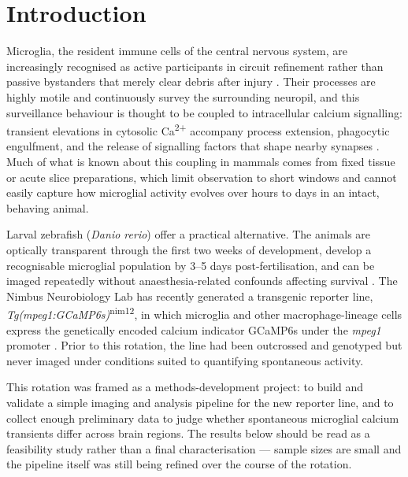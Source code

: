 \section{Introduction}

Microglia, the resident immune cells of the central nervous system, are increasingly
recognised as active participants in circuit refinement rather than passive bystanders
that merely clear debris after injury \citep{nimodorf2019microglia}. Their processes
are highly motile and continuously survey the surrounding neuropil, and this surveillance
behaviour is thought to be coupled to intracellular calcium signalling: transient
elevations in cytosolic Ca\textsuperscript{2+} accompany process extension, phagocytic
engulfment, and the release of signalling factors that shape nearby synapses
\citep{umariz2021calcium}. Much of what is known about this coupling in mammals comes
from fixed tissue or acute slice preparations, which limit observation to short windows
and cannot easily capture how microglial activity evolves over hours to days in an
intact, behaving animal.

Larval zebrafish (\emph{Danio rerio}) offer a practical alternative. The animals are
optically transparent through the first two weeks of development, develop a
recognisable microglial population by 3--5 days post-fertilisation, and can be imaged
repeatedly without anaesthesia-related confounds affecting survival
\citep{svendrup2018larval}. The Nimbus Neurobiology Lab has recently generated a
transgenic reporter line, \emph{Tg(mpeg1:GCaMP6s)}\textsuperscript{nim12}, in which
microglia and other macrophage-lineage cells express the genetically encoded calcium
indicator GCaMP6s under the \emph{mpeg1} promoter \citep{ellenport2017mpeg1}. Prior to
this rotation, the line had been outcrossed and genotyped but never imaged under
conditions suited to quantifying spontaneous activity.

This rotation was framed as a methods-development project: to build and validate a
simple imaging and analysis pipeline for the new reporter line, and to collect enough
preliminary data to judge whether spontaneous microglial calcium transients differ
across brain regions. The results below should be read as a feasibility study rather
than a final characterisation --- sample sizes are small and the pipeline itself was
still being refined over the course of the rotation.

